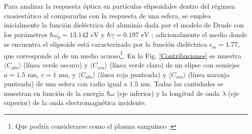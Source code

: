 Para analizar la respuesta óptica en partículas elipsoidales dentro del régimen cuasiestático al compararlas con la respuesta de una esfera, se emplea inicialmente la función dieléctrica del aluminio dada por el modelo de Drude con los parámetros $\hbar\omega_p=13.142\text{ eV}$ y $\hbar\gamma=0.197\text{ eV}$ \cite{Aluminio}; adicionalmente el medio donde se encuentra el elipsoide está caracterizado por la función dieléctrica $\epsilon_m = 1.77$, que corresponde al de un medio acuoso\footnote{Que podría considerarse como el plasma sanguíneo \cite{Blood}.}. En la Fig. \ref{Contribuciones} se muestra $\langle C_{abs} \rangle$ (línea verde oscuro) y $\langle C_{sca} \rangle$ (línea verde claro) de  un elipse con semiejes $a=1.5\text{ nm}$, $c=1\text{ nm}$, y $\langle C_{abs} \rangle$ (línea roja punteada) y $\langle C_{sca} \rangle$ (línea naranja punteada) de una esfera con radio igual a $1.5\text{ nm}$. Todas las cantidades se muestran
en función de la energía $\hbar\omega$ (eje inferior) y la longitud de onda $\lambda$ (eje superior) de la onda electromagnética incidente. \\
